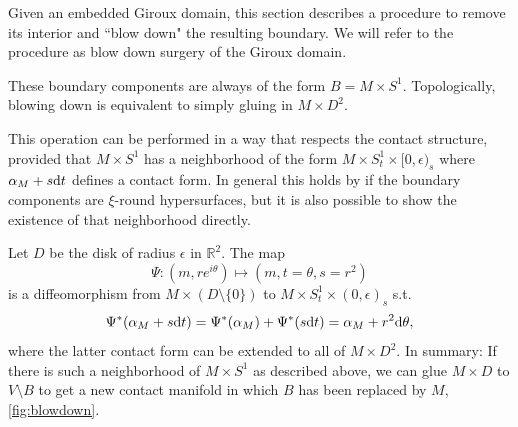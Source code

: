 Given an embedded Giroux domain, this section describes a procedure
to remove its interior and ``blow down" the resulting boundary.
We will refer to the procedure as blow down surgery of the Giroux domain.

These boundary components are always of the form $B = M \times S^1$.
Topologically, blowing down is equivalent to simply gluing in $M\times D^2$.

This operation can be performed in a way that respects the contact structure,
provided that $M \times S^1$ has a neighborhood
of the form $M \times S^1_t \times [0, \epsilon)_s$ where $\alpha_M + s \mathrm{d} t$
defines a contact form.
In general this holds by \cite[Lemma 5.1]{MNW13} if the boundary components 
are $\xi$-round hypersurfaces, but it is also possible to show the existence 
of that neighborhood directly.

Let $D$ be the disk of radius $\epsilon$ in $\mathbb R^2$. The map 
\[
    \Psi \colon (m, re^{i\theta}) \mapsto (m, t = \theta, s = r^2)
\]
is a diffeomorphism from $M \times (D \setminus \{0\})$ to 
$M \times S^1_t \times (0, \epsilon)_s$ s.t.
\[
    \Psi^*(\alpha_M + s \mathrm{d} t) = \Psi^*(\alpha_M) + \Psi^*(s\mathrm{d} t) 
    = \alpha_M + r^2 \mathrm{d} \theta,
\]
where the latter contact form can be extended to all of $M \times D^2$.
In summary: If there is such a neighborhood of $M \times S^1$ as described above, 
we can glue $M \times D$ to $V \setminus B$ to get a new contact manifold 
in which $B$ has been replaced by $M$, \cref{fig:blowdown}.

